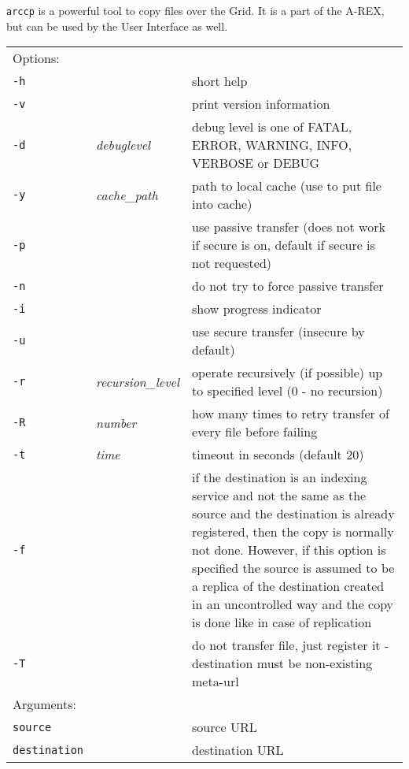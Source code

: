 \texttt{arccp} is a powerful
tool to copy files over the Grid. It is a part of the A-REX,
but can be used by the User Interface as well.
\hspace*{0.5cm}
\begin{shaded}
\end{shaded}
\begin{longtable}{llp{8cm}}
    Options:&&\\
    \texttt{-h} && short help\\
    \texttt{-v} && print version information\\
    \texttt{-d} & \textit{debuglevel} &debug level is one of  FATAL, ERROR, WARNING, INFO, VERBOSE or DEBUG\\
    \texttt{-y} & \textit{cache\_path} & path to local cache (use to put file into cache)\\
    \texttt{-p} && use passive transfer (does not work if secure is on, default if secure is not requested)\\
    \texttt{-n} && do not try to force passive transfer\\
    \texttt{-i} && show progress indicator\\
    \texttt{-u} && use secure transfer (insecure by default)\\
    \texttt{-r} & \textit{recursion\_level} & operate recursively (if possible) up to specified level (0 - no recursion)\\
    \texttt{-R} & \textit{number} & how many times to retry transfer of every file before failing\\
    \texttt{-t} & \textit{time} & timeout in seconds (default 20)\\
    \texttt{-f} && if the destination is an indexing service and not the same as the source and the destination is already registered, then the copy is normally not done. However, if this option is specified the source is assumed to be a replica of the destination created in an uncontrolled way and the copy is done like in case of replication\\
    \texttt{-T} && do not transfer file, just register it - destination must be non-existing meta-url\\
    Arguments:&&\\
    \texttt{source} && source URL\\
    \texttt{destination} && destination URL\\
\end{longtable}

